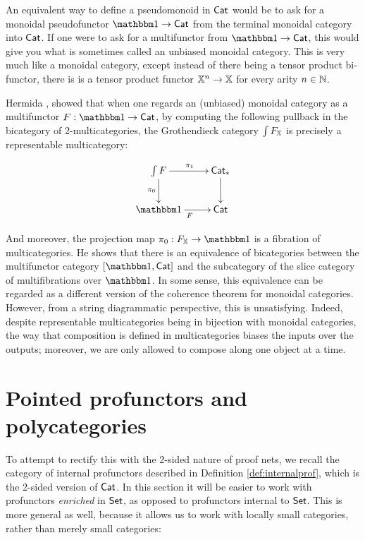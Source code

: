 

An equivalent way to define a pseudomonoid in ${\sf Cat}$ would be to ask for a monoidal pseudofunctor $\one\to \Cat$ from the terminal monoidal category into ${\sf Cat}$.  If one were to ask for a multifunctor from $\one\to \Cat$, this would give you what is sometimes called an unbiased monoidal category. This is very much like a monoidal category, except instead of there being a tensor product bi-functor, there is is a tensor product functor $\mathbb{X}^n\to \mathbb{X}$ for every arity $n \in \mathbb{N}$.


Hermida \cite{hermida}, showed that when one regards an (unbiased) monoidal category as a multifunctor $F:\one\to\Cat$, by computing the following pullback in the bicategory of 2-multicategories, the Grothendieck category $\int F_{\mathbb{X}}$ is precisely a representable multicategory:

$$
\xymatrix{
\int  F \ar[r]^{\pi_1} \ar[d]_{\pi_0} & \Cat_* \ar[d] \\
\one \ar[r]_F & \Cat
}
$$



And moreover, the projection map $\pi_0:F_\X\to \one$ is a fibration of multicategories.  He shows that there is an equivalence of bicategories between the multifunctor category $[\one,\Cat]$ and the subcategory of the slice category of multifibrations over $\one$.  
In some sense, this equivalence can be regarded as a different version of the coherence theorem for monoidal categories.
However, from a string diagrammatic perspective, this is unsatisfying.  Indeed, despite representable multicategories being in bijection with monoidal categories, the way that composition is defined in multicategories biases the inputs over the outputs; moreover, we are only allowed to compose along one object at a time.



\section{Pointed profunctors and polycategories}

To attempt to rectify this with the 2-sided nature of proof nets, we recall the category of internal profunctors described in Definition \ref{def:internalprof}, which is the 2-sided version of ${\sf Cat}$.  In this section it will be easier to work with profunctors {\em enriched} in $\mathsf{Set}$, as opposed to profunctors internal to $\mathsf{Set}$.  This is more general as well, because it allows us to work with locally small categories, rather than merely small categories:


